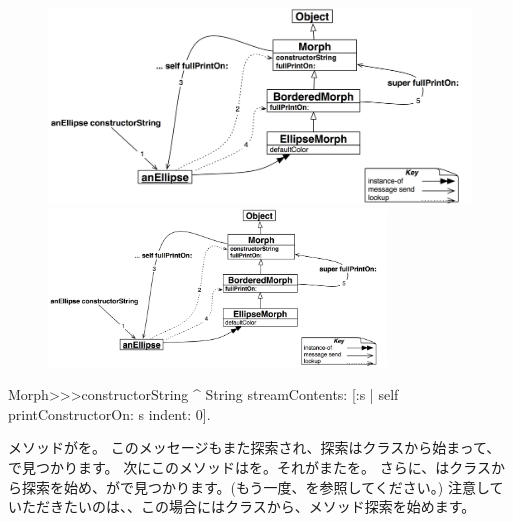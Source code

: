 \documentclass[a4paper,10pt,twoside]{book}
\begin{document}
\begin{figure}[htb]
\begin{center}
\ifluluelse
	{\includegraphics[width=\textwidth]{constructorStringLookup}}
	{\includegraphics[width=0.8\textwidth]{constructorStringLookup}}
\caption{}
\end{center}
\end{figure}

\begin{method}[constructorString]{}
Morph>>>constructorString
	^ String streamContents: [:s | self printConstructorOn: s indent: 0].
\end{method}
メソッドがを。
このメッセージもまた探索され、探索はクラスから始まって、で見つかります。
次にこのメソッドはを。それがまたを。
さらに、はクラスから探索を始め、がで見つかります。(もう一度、を参照してください。)
注意していただきたいのは、、この場合にはクラスから、メソッド探索を始めます。

\end{document}
